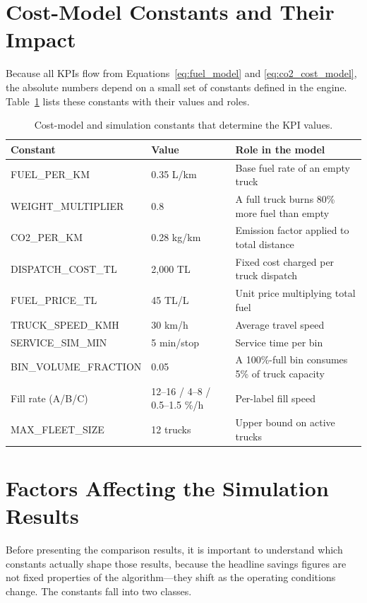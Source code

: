 \section{Cost-Model Constants and Their Impact}
\label{sec:cost_constants}

\indent Because all KPIs flow from Equations~\ref{eq:fuel_model} and \ref{eq:co2_cost_model}, the absolute numbers depend on a small set of constants defined in the engine. Table~\ref{tab:cost_constants} lists these constants with their values and roles.

\begin{table}[H]
\centering
\caption{Cost-model and simulation constants that determine the KPI values.}
\label{tab:cost_constants}
\begin{tabular}{lll}
\toprule
\textbf{Constant} & \textbf{Value} & \textbf{Role in the model} \\
\midrule
FUEL\_PER\_KM        & 0.35 L/km        & Base fuel rate of an empty truck \\
WEIGHT\_MULTIPLIER   & 0.8              & A full truck burns 80\% more fuel than empty \\
CO2\_PER\_KM         & 0.28 kg/km       & Emission factor applied to total distance \\
DISPATCH\_COST\_TL   & 2,000 TL         & Fixed cost charged per truck dispatch \\
FUEL\_PRICE\_TL      & 45 TL/L          & Unit price multiplying total fuel \\
TRUCK\_SPEED\_KMH    & 30 km/h          & Average travel speed \\
SERVICE\_SIM\_MIN    & 5 min/stop       & Service time per bin \\
BIN\_VOLUME\_FRACTION & 0.05            & A 100\%-full bin consumes 5\% of truck capacity \\
Fill rate (A/B/C)    & 12--16 / 4--8 / 0.5--1.5 \%/h & Per-label fill speed \\
MAX\_FLEET\_SIZE     & 12 trucks        & Upper bound on active trucks \\
\bottomrule
\end{tabular}
\end{table}

\section{Factors Affecting the Simulation Results}
\label{sec:factors}

\indent Before presenting the comparison results, it is important to understand which constants actually shape those results, because the headline savings figures are not fixed properties of the algorithm---they shift as the operating conditions change. The constants fall into two classes.

